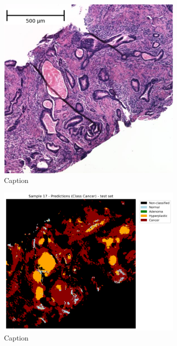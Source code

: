 \begin{figure}[htbp]
  \centering
  \includegraphics[width=0.8\textwidth]{Images/he_17_scale.png}
  \caption{Caption}
  \label{fig:my-label}
\end{figure}

\begin{figure}[htbp]
  \centering
  \includegraphics[width=0.8\textwidth]{Images/Predicton_17.png}
  \caption{Caption}
  \label{fig:my-label}
\end{figure}

